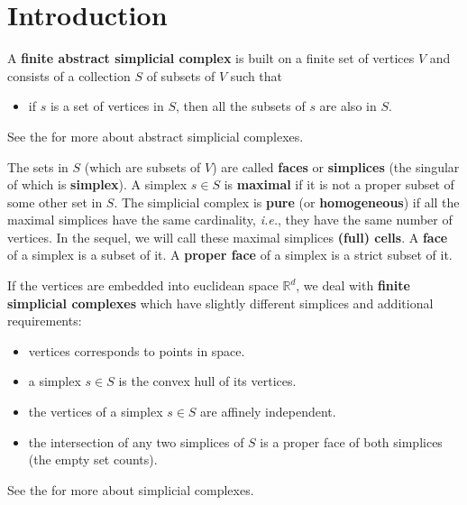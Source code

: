 
\newcommand{\note}[1]{\begin{ccTexOnly}%
{\color{red}$\langle\!\langle$#1$\rangle\!\rangle$}\end{ccTexOnly}}
\newcommand{\sphere}{\ensuremath{\mathcal S}}
\renewcommand{\real}{\ensuremath{\mathbb R}}

\section{Introduction\label{triangulation:intro}}

A \textbf{finite abstract simplicial complex} is built on a finite set of
vertices $V$ and consists of a collection $S$ of subsets of $V$ such that
\begin{itemize}
\item if $s$ is a set of vertices in $S$, then all the subsets of $s$ are also
in $S$.
\end{itemize}
See the
 for more about abstract simplicial complexes.

The sets in $S$ (which are subsets of $V$) are called
\textbf{faces} or \textbf{simplices} (the
singular of which is \textbf{simplex}).
%
A simplex $s\in S$ is \textbf{maximal} if it is not a proper subset of some other
set in $S$. The simplicial complex is \textbf{pure} (or \textbf{homogeneous})
if all the maximal simplices have the same cardinality, \emph{i.e.}, they have the same
number of vertices. 
In the sequel, we will call these maximal simplices \textbf{(full) cells}.
A \textbf{face} of a simplex is a subset of it.
A \textbf{proper face} of a simplex is a strict subset of it.

If the vertices are embedded into euclidean space $\real^d$, we deal with
\textbf{finite simplicial complexes} which have slightly different simplices
and additional requirements:
\begin{itemize}
\item vertices corresponds to points in space.
\item a simplex $s\in S$ is the convex hull of its vertices.
\item the vertices of a simplex $s\in S$ are affinely independent.
\item the intersection of any two simplices of $S$ is a proper face of both
simplices (the empty set counts).
\end{itemize}
See the  for more about simplicial complexes.

